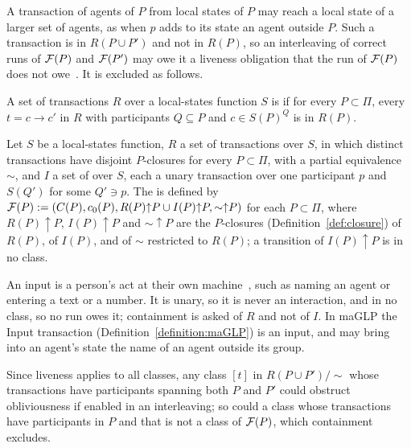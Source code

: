 A transaction of agents of $P$ from local states of $P$ may reach a local state of a larger set of agents, as when $p$ adds to its state an agent outside $P$. Such a transaction is in $R(P \cup P')$ and not in $R(P)$, so an interleaving of correct runs of $\mathcal{F}(P)$ and $\mathcal{F}(P')$ may owe it a liveness obligation that the run of $\mathcal{F}(P)$ does not owe~\cite{lewis2026volitional}. It is excluded as follows.

\begin{definition}\label{definition:contained}
A set of transactions $R$ over a local-states function $S$ is  if for every $P \subset \Pi$, every $t = c \rightarrow c'$ in $R$ with participants $Q \subseteq P$ and $c \in S(P)^Q$ is in $R(P)$.
\end{definition}

\begin{definition}\label{definition:tb-protocol}
Let $S$ be a local-states function, $R$ a set of transactions over $S$, in which distinct transactions have disjoint $P$-closures for every $P \subset \Pi$, with a partial equivalence $\sim$, and $I$ a set of  over $S$, each a unary transaction over one participant $p$ and $S(Q')$ for some $Q' \ni p$. The  is defined by $\mathcal{F}(P) := (C(P), c_0(P), R(P){\uparrow}P \cup I(P){\uparrow}P, {\sim}{\uparrow}P)$ for each $P \subset \Pi$, where $R(P){\uparrow}P$, $I(P){\uparrow}P$ and ${\sim}{\uparrow}P$ are the $P$-closures (Definition~\ref{def:closure}) of $R(P)$, of $I(P)$, and of $\sim$ restricted to $R(P)$; a transition of $I(P){\uparrow}P$ is in no class.
\end{definition}

An input is a person's act at their own machine~\cite{lewis2026volitional}, such as naming an agent or entering a text or a number. It is unary, so it is never an interaction, and in no class, so no run owes it; containment is asked of $R$ and not of $I$. In maGLP the Input transaction (Definition~\ref{definition:maGLP}) is an input, and may bring into an agent's state the name of an agent outside its group.

Since liveness applies to all classes, any class $[t]$ in $R(P \cup P')/{\sim}$ whose transactions have participants spanning both $P$ and $P'$ could obstruct obliviousness if enabled in an interleaving; so could a class whose transactions have participants in $P$ and that is not a class of $\mathcal{F}(P)$, which containment excludes.

